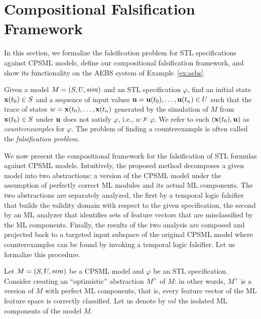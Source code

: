\section{Compositional Falsification Framework}
\label{sec:framework}

In this section, we formalize the falsification problem for STL specifications against CPSML models,
define our compositional falsification framework, and show its functionality on the AEBS system of
Example~\ref{ex:aebs}.



\begin{definition}
Given a model $M = (S,U,sim)$ and an STL specification $\varphi$,
find an initial state $\mathbf{x}(t_0) \in S$ and a sequence of input values
$\mathbf{u} = \mathbf{u}(t_0), \dots, \mathbf{u}(t_n) \in U$ such that the trace of states
$w = \mathbf{x}(t_0),\dots, \mathbf{x}(t_n)$
generated by the simulation of $M$ from $\mathbf{x}(t_0) \in S$
under $\mathbf{u}$ does not satisfy $\varphi$,
i.e., $w \not\models \varphi$.
We refer to such $(\mathbf{x}(t_0),\mathbf{u})$ as \emph{counterexamples} for $\varphi$.
The problem of finding a counterexample is often called
the \emph{falsification problem}.
\label{defn:fals_prob}
\end{definition}

We now present the compositional framework for the falsification of STL formulas against CPSML models.
Intuitively, the proposed method decomposes a given model into two abstractions: a version of the CPSML model
under the assumption of perfectly correct ML modules and its actual ML components. The two abstractions
are separately analyzed, the first by a temporal logic falsifier that builds the validity domain with respect to the given specification,
the second by an ML analyzer that identifies sets of feature vectors that are misclassified by the ML components.
Finally, the results of the two analysis are composed and projected back to a targeted input subspace of the original CPSML model
where  counterexamples can be found by invoking a temporal logic falsifier.
Let us formalize this procedure.

Let $M = (S,U,sim)$ be a CPSML model and $\varphi$ be an STL specification.
Consider creating an ``optimistic'' abstraction $M^+$ of $M$:
in other words, $M^+$ is a version of $M$ with perfect ML components, 
that is,
every feature vector of the ML feature space is correctly classified. Let us denote
by $ml$ the isolated ML components of the model $M$.

